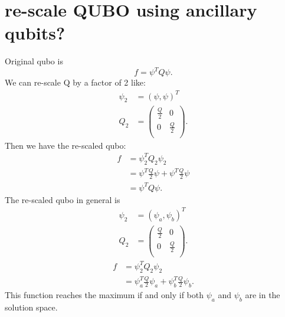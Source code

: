 \documentclass[]{article}
\begin{document}
\section{re-scale QUBO using ancillary qubits?}

Original qubo is
\begin{equation}
f= \psi^T Q \psi .
\end{equation}
We can re-scale Q by a factor of 2 like:
 \begin{align}
\psi_2 &= (\psi , \psi)^T \\
Q_2 &= 
\begin{pmatrix}
\frac{Q}{2} & 0 \\
0 & \frac{Q}{2} \\
\end{pmatrix} .
\end{align}
Then we have the re-scaled qubo:
\begin{align}
f &= \psi_2^T Q_2 \psi_2 \\
&=  \psi^T  \frac{Q}{2} \psi +  \psi^T  \frac{Q}{2} \psi \\
&=  \psi^T Q \psi .
\end{align}
The re-scaled qubo in general is
 \begin{align}
\psi_2 &= (\psi_a , \psi_b)^T \\
Q_2 &= 
\begin{pmatrix}
\frac{Q}{2} & 0 \\
0 & \frac{Q}{2} \\
\end{pmatrix} .
\end{align}
\begin{align}
f &= \psi_2^T Q_2 \psi_2 \\
&=  \psi_a^T  \frac{Q}{2} \psi_a +  \psi_b^T  \frac{Q}{2} \psi_b .
\end{align}
This function reaches the maximum if and only if both $\psi_a$ and $\psi_b$ are in the solution space.
\end{document}
